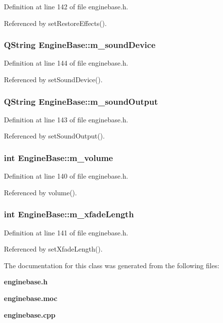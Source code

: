 Definition at line 142 of file enginebase.h.

Referenced by set\-Restore\-Effects().
\subsubsection{\setlength{\rightskip}{0pt plus 5cm}QString {\bf Engine\-Base::m\_\-sound\-Device}\hspace{0.3cm}{\tt  [protected]}}\label{classEngineBase_EngineBasep5}




Definition at line 144 of file enginebase.h.

Referenced by set\-Sound\-Device().
\subsubsection{\setlength{\rightskip}{0pt plus 5cm}QString {\bf Engine\-Base::m\_\-sound\-Output}\hspace{0.3cm}{\tt  [protected]}}\label{classEngineBase_EngineBasep4}




Definition at line 143 of file enginebase.h.

Referenced by set\-Sound\-Output().
\subsubsection{\setlength{\rightskip}{0pt plus 5cm}int {\bf Engine\-Base::m\_\-volume}\hspace{0.3cm}{\tt  [protected]}}\label{classEngineBase_EngineBasep1}




Definition at line 140 of file enginebase.h.

Referenced by volume().
\subsubsection{\setlength{\rightskip}{0pt plus 5cm}int {\bf Engine\-Base::m\_\-xfade\-Length}\hspace{0.3cm}{\tt  [protected]}}\label{classEngineBase_EngineBasep2}




Definition at line 141 of file enginebase.h.

Referenced by set\-Xfade\-Length().

The documentation for this class was generated from the following files:\begin{CompactItemize}
\item 
{\bf enginebase.h}\item 
{\bf enginebase.moc}\item 
{\bf enginebase.cpp}\end{CompactItemize}

